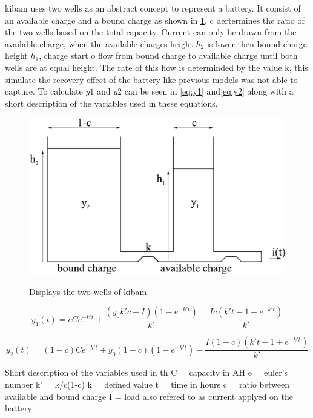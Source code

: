 \gls{kibam} uses two wells as an abstract concept to represent a battery. It consist of an available charge and a bound charge as shown in \cref{fig:kibam_wells}, c dertermines the ratio of the two wells based on the total capacity. Current can only be drawn from the available charge, when the available charges height $h_2$ is lower then bound charge height $h_1$, charge start o flow from bound charge to available charge until both wells are at equal height. The rate of this flow is determinded by the value k, this simulate the recovery effect of the battery like previous models was not able to capture. To calculate $y{1}$ and $y{2}$ can be seen in \cref{eq:y1} and\cref{eq:y2} along with a short description of the variables used in these equations. 

\begin{figure}
	\center
	\includegraphics[width=\textwidth/2]{graphics/kibam.jpg}
	\label{fig:kibam_wells}
	\caption{Displays the two wells of \gls{kibam}}
\end{figure}

\begin{equation}\label{eq:y1}
y_1(t) = cCe^{-k't}+\frac{(y_0k'c-I)(1-e^{-k't})}{k'}-\frac{Ic(k't-1+e^{-k't})}{k'}
\end{equation}

\begin{equation}\label{eq:y2}
y_2(t) = (1-c)Ce^{-k't}+y_0(1-c)(1-e^{-k't})-\frac{I(1-c)(k't-1+e^{-k't})}{k'}
\end{equation}

Short description of the variables used in th
C = capacity in AH
e = euler's number
k' = k/c(1-c)
k = defined value
t = time in hours
c = ratio between available and bound charge
I = load also refered to as current applyed on the battery


